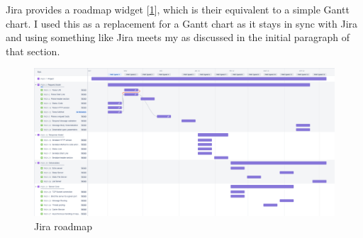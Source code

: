 \documentclass[12pt, a4paper]{article}
\begin{document}
Jira provides a roadmap widget [\ref{fig:jira-roadmap}], which is their equivalent to a
simple Gantt chart. I used this as a replacement for a Gantt chart as it stays in sync with Jira and
using something like Jira meets my  as discussed in the initial
paragraph of that section.

\begin{figure}
  \centering 
  \includegraphics[width=1\textwidth]{project-roadmap.png}
  \caption{Jira roadmap}
  \label{fig:jira-roadmap}
\end{figure}

\newpage
\printbibliography
\end{document}
